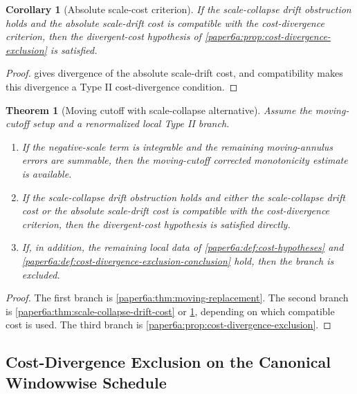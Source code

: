 \documentclass[11pt]{amsart}
\theoremstyle{plain}
\newtheorem{theorem}{Theorem}[section]
\newtheorem{corollary}[corollary]{Corollary}
\theoremstyle{definition}
\theoremstyle{remark}
\begin{document}
\begin{corollary}[Absolute scale-cost criterion]\label{paper6a:cor:absolute-scale-cost-criterion}
If the scale-collapse drift obstruction holds and the absolute scale-drift
cost is compatible with the cost-divergence criterion, then the divergent-cost hypothesis of
\cref{paper6a:prop:cost-divergence-exclusion} is satisfied.
\end{corollary}

\begin{proof}
 gives divergence of the absolute
scale-drift cost, and compatibility makes this divergence a Type II
cost-divergence condition.
\end{proof}

\begin{theorem}[Moving cutoff with scale-collapse alternative]
\label{paper6a:thm:moving-cutoff-scale-collapse-alternative}
Assume the moving-cutoff setup and a renormalized local Type II branch.
\begin{enumerate}[label=\textup{(\roman*)}]
\item If the negative-scale term is integrable and the remaining moving-annulus
errors are summable, then the moving-cutoff corrected monotonicity estimate is
available.
\item If the scale-collapse drift obstruction holds and either the
scale-collapse drift cost or the absolute scale-drift cost is compatible with
the cost-divergence criterion, then the divergent-cost hypothesis is satisfied
directly.
\item If, in addition, the remaining local data of
\cref{paper6a:def:cost-hypotheses} and
\cref{paper6a:def:cost-divergence-exclusion-conclusion} hold, then the branch is excluded.
\end{enumerate}
\end{theorem}

\begin{proof}
The first branch is \cref{paper6a:thm:moving-replacement}.  The second branch
is \cref{paper6a:thm:scale-collapse-drift-cost} or
\cref{paper6a:cor:absolute-scale-cost-criterion}, depending on which compatible
cost is used.  The third branch is
\cref{paper6a:prop:cost-divergence-exclusion}.
\end{proof}

\subsection{Cost-Divergence Exclusion on the Canonical Windowwise Schedule}
\label{paper6a:subsec:cost-divergence-canonical-schedule}
\end{document}
